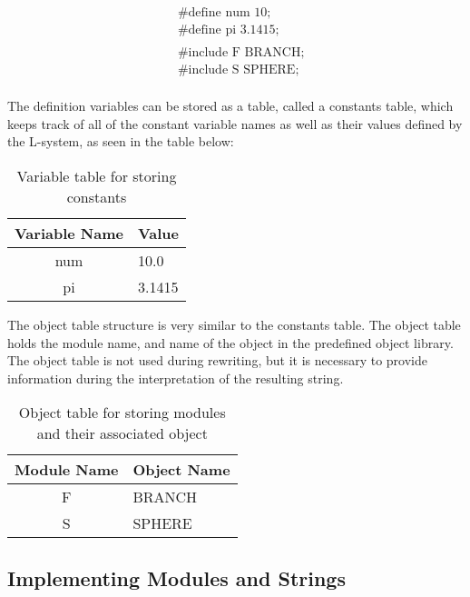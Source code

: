 \begin{equation} \label{constant and object example}
\begin{aligned}
	&\text{\#define num 10;}\\
	&\text{\#define pi 3.1415;}\\
	&\\
	&\text{\#include F BRANCH;}\\
	&\text{\#include S SPHERE;}\\
\end{aligned}
\end{equation}

\noindent
The definition variables can be stored as a table, called a constants table, which keeps track of all of the constant variable names as well as their values defined by the L-system, as seen in the table below: 

\begin{table}[h!] \center
\begin{tabular}{ | c | l | }
\hline
	Variable Name 	& Value\\  
\hline
\hline
	num 				& 10.0\\
\hline
	pi					& 3.1415\\
\hline
\end{tabular}
\caption{Variable table for storing constants}
\label{constants table}
\end{table}
\FloatBarrier

\noindent
The object table structure is very similar to the constants table. The object table holds the module name, and name of the object in the predefined object library. The object table is not used during rewriting, but it is necessary to provide information during the interpretation of the resulting string. 

\begin{table}[h!] \center
\begin{tabular}{ | c | l | }
\hline
	Module Name	& Object Name\\  
\hline
\hline
	F 				& BRANCH\\
\hline
	S				& SPHERE\\
\hline
\end{tabular}
\caption{Object table for storing modules and their associated object}
\label{constants table}
\end{table}
\FloatBarrier

\subsection{Implementing Modules and Strings} \label{modules and strings}

